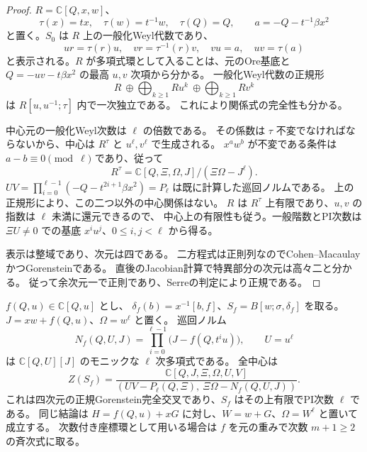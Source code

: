 \begin{proof}
$R=\mathbb C[Q,x,w]$、
\[
 \tau(x)=tx,\quad\tau(w)=t^{-1}w,\quad\tau(Q)=Q,
 \qquad a=-Q-t^{-1}\beta x^2
\]
と置く。$S_0$ は $R$ 上の一般化Weyl代数であり、
\[
 ur=\tau(r)u,\quad vr=\tau^{-1}(r)v,\quad vu=a,\quad uv=\tau(a)
\]
と表示される。$R$ が多項式環として入ることは、元のOre基底と
$Q=-uv-t\beta x^2$ の最高 $u,v$ 次項から分かる。
一般化Weyl代数の正規形
\[
 R\ \oplus\bigoplus_{k\ge1}Ru^k\ \oplus\bigoplus_{k\ge1}Rv^k
\]
は $R[u,u^{-1};\tau]$ 内で一次独立である。
これにより関係式の完全性も分かる。

中心元の一般化Weyl次数は $\ell$ の倍数である。
その係数は $\tau$ 不変でなければならないから、中心は
$R^\tau$ と $u^\ell,v^\ell$ で生成される。
$x^aw^b$ が不変である条件は $a-b\equiv0\pmod\ell$ であり、従って
\[
 R^\tau=\mathbb C[Q,\Xi,\Omega,J]/(\Xi\Omega-J^\ell).
\]
$UV=\prod_{i=0}^{\ell-1}(-Q-t^{2i+1}\beta x^2)=P_\ell$ は既に計算した巡回ノルムである。
上の正規形により、この二つ以外の中心関係はない。
$R$ は $R^\tau$ 上有限であり、$u,v$ の指数は $\ell$ 未満に還元できるので、
中心上の有限性も従う。一般階数とPI次数は $\Xi U\ne0$ での基底
$x^iu^j$、$0\le i,j<\ell$ から得る。

表示は整域であり、次元は四である。
二方程式は正則列なのでCohen--MacaulayかつGorensteinである。
直後のJacobian計算で特異部分の次元は高々二と分かる。
従って余次元一で正則であり、Serreの判定により正規である。
\end{proof}

\begin{theorem}[一変数混合項の全中心]
\label{thm:global-polynomial-center-v40}
$f(Q,u)\in\mathbb C[Q,u]$ とし、
$\delta_f(b)=x^{-1}[b,f]$、$S_f=B[w;\sigma,\delta_f]$ を取る。
$J=xw+f(Q,u)$、$\Omega=w^\ell$ と置く。
巡回ノルム
\[
 N_f(Q,U,J)=\prod_{i=0}^{\ell-1}\bigl(J-f(Q,t^iu)\bigr),\qquad U=u^\ell
\]
は $\mathbb C[Q,U][J]$ のモニックな $\ell$ 次多項式である。
全中心は
\begin{equation}\label{eq:global-polynomial-center-v40}
 Z(S_f)=
 \frac{\mathbb C[Q,J,\Xi,\Omega,U,V]}
 {(UV-P_\ell(Q,\Xi),\ \Xi\Omega-N_f(Q,U,J))}.
\end{equation}
これは四次元の正規Gorenstein完全交叉であり、$S_f$ はその上有限でPI次数 $\ell$ である。
同じ結論は $H=f(Q,u)+xG$ に対し、$W=w+G$、$\Omega=W^\ell$ と置いて成立する。
次数付き座標環として用いる場合は $f$ を元の重みで次数 $m+1\ge2$ の斉次式に取る。
\end{theorem}

